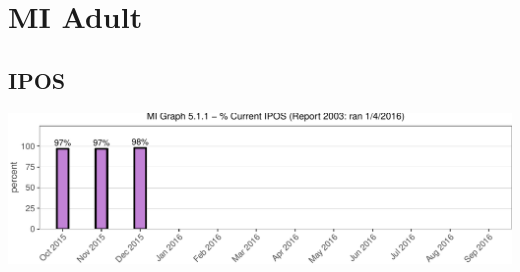\documentclass{article}\usepackage[]{graphicx}\usepackage[]{color}
\makeatletter
\def\maxwidth{ %
  \ifdim\Gin@nat@width>\linewidth
    \linewidth
  \else
    \Gin@nat@width
  \fi
}
\newenvironment{knitrout}{}{} %
\newenvironment{absolutelynopagebreak}
  {\par\nobreak\vfil\penalty0\vfilneg
   \vtop\bgroup}
  {\par\xdef\tpd{\the\prevdepth}\egroup
   \prevdepth=\tpd}
\makeatother
\begin{document}



\section{MI Adult}
\subsection{IPOS}
\begin{knitrout}
\color{fgcolor}
\includegraphics[width=\maxwidth]{figure/mi_hist-1} 

\end{knitrout}
\end{document}
